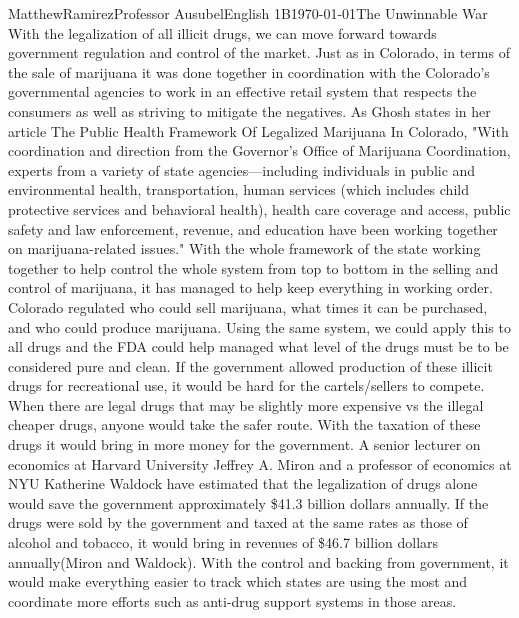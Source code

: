 \documentclass[12pt,letterpaper]{article}
\begin{document}
\begin{mla}{Matthew}{Ramirez}{Professor Ausubel}{English 1B}{\today}{The Unwinnable War}
\label{What should we do? Pt.3 The Government regulation and control}
With the legalization of all illicit drugs, we can move forward towards government regulation and control of the market. Just as in Colorado, in terms of the sale of marijuana it was done together in coordination with the Colorado's governmental agencies to work in an effective retail system that respects the consumers as well as striving to mitigate the negatives. As Ghosh states in her article The Public Health Framework Of Legalized Marijuana In Colorado, "With coordination and direction from the Governor’s Office of Marijuana Coordination, experts from a variety of state agencies—including individuals in public and environmental health, transportation, human services (which includes child protective services and behavioral health), health care coverage and access, public safety and law enforcement, revenue, and education have been working together on marijuana-related issues." With the whole framework of the state working together to help control the whole system from top to bottom in the selling and control of marijuana, it has managed to help keep everything in working order. Colorado regulated who could sell marijuana, what times it can be purchased, and who could produce marijuana. Using the same system, we could apply this to all drugs and the FDA could help managed what level of the drugs must be to be considered pure and clean. If the government allowed production of these illicit drugs for recreational use, it would be hard for the cartels/sellers to compete. When there are legal drugs that may be slightly more expensive vs the illegal cheaper drugs, anyone would take the safer route. With the taxation of these drugs it would bring in more money for the government. A senior lecturer on economics at Harvard University Jeffrey A. Miron and a professor of economics at NYU Katherine Waldock have estimated that the legalization of drugs alone would save the government approximately \$41.3 billion dollars annually. If the drugs were sold by the government and taxed at the same rates as those of alcohol and tobacco, it would bring in revenues of \$46.7 billion dollars annually(Miron and Waldock). With the control and backing from government, it would make everything easier to track which states are using the most and coordinate more efforts such as anti-drug support systems in those areas.\\
\label{The Aftermath}

\end{mla}
\end{document}
